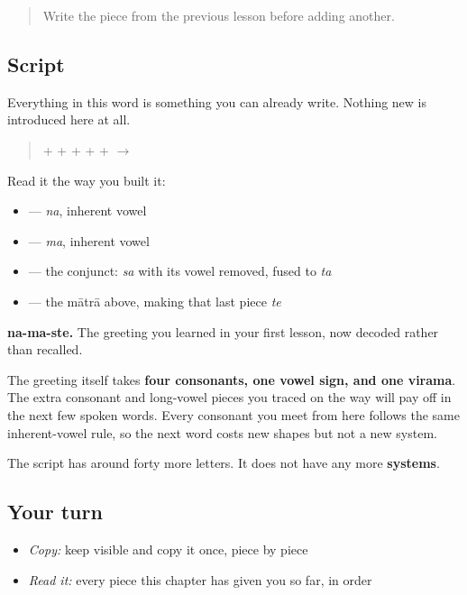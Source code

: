 \label{lesson:GU-W01-namaste-read}



\begin{quote}
Write the piece from the previous lesson before adding another.
\end{quote}

\subsection*{Script}
Everything in this word is something you can already write. Nothing new is introduced here at all.

\begin{quote}
\textbf{} + \textbf{} + \textbf{} + \textbf{} + \textbf{} + \textbf{} $\to$ \textbf{}
\end{quote}

Read it the way you built it:

\begin{itemize}
\raggedright
  \item \textbf{} — \emph{na}, inherent vowel
  \item \textbf{} — \emph{ma}, inherent vowel
  \item \textbf{} — the conjunct: \emph{sa} with its vowel removed, fused to \emph{ta}
  \item \textbf{} — the mātrā above, making that last piece \emph{te}
\end{itemize}

\textbf{na-ma-ste.} The greeting you learned in your first lesson, now decoded rather than recalled.

The greeting itself takes \textbf{four consonants, one vowel sign, and one virama}. The extra consonant and long-vowel pieces you traced on the way will pay off in the next few spoken words. Every consonant you meet from here follows the same inherent-vowel rule, so the next word costs new shapes but not a new system.

The script has around forty more letters. It does not have any more \textbf{systems}.

\subsection*{Your turn}
\begin{itemize}
\raggedright
  \item \emph{Copy:} keep  visible and copy it once, piece by piece
  \item \emph{Read it:} every piece this chapter has given you so far, in order
\end{itemize}

